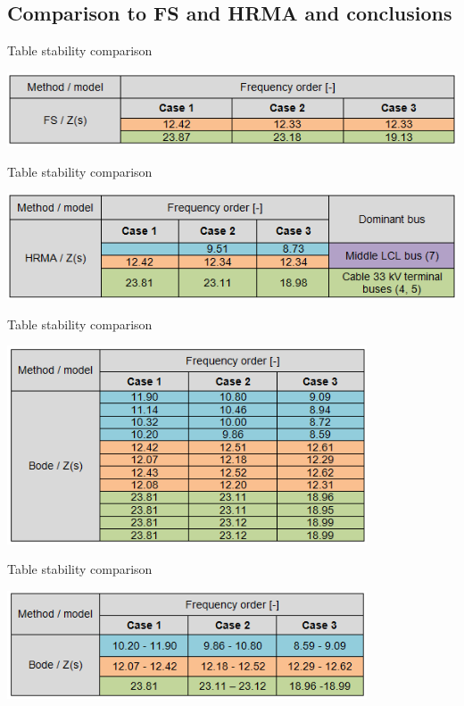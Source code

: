 \documentclass[12pt]{report} %
\begin{document}
\subsection{Comparison to FS and HRMA and conclusions}

\begin{table}[htb]
	\centering
	\caption{Table stability comparison}
	\includegraphics[width=1\textwidth]{img/Case123/stability_comparison_table_fs.png}
  	\label{tab:stability_comparison_table_fs}
\end{table}
\FloatBarrier

\begin{table}[htb]
	\centering
	\caption{Table stability comparison}
	\includegraphics[width=1\textwidth]{img/Case123/stability_comparison_table_hrma.png}
  	\label{tab:stability_comparison_table_hrma}
\end{table}
\FloatBarrier

\begin{table}[htb]
	\centering
	\caption{Table stability comparison}
	\includegraphics[width=0.8\textwidth]{img/Case123/stability_comparison_table_bode1.png}
  	\label{tab:stability_comparison_table_bode1}
\end{table}
\FloatBarrier

\begin{table}[htb]
	\centering
	\caption{Table stability comparison}
	\includegraphics[width=0.8\textwidth]{img/Case123/stability_comparison_table_bode2.png}
  	\label{tab:stability_comparison_table_bode2}
\end{table}
\FloatBarrier



\end{document}

